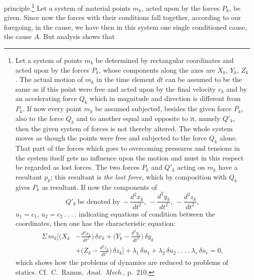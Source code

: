 \documentclass[12pt,a4paper]{book}
\begin{document}
principle.\footnote{Let a system of points $m_{k}$ be determined by rectangular coordinates
and acted upon by the forces $P_{k}$, whose components along the axes are $X_{k}$, $Y_{k}$,
$Z_{k}$. The actual motion of $m_{k}$ in the time element $dt$ can be assumed to be the same
as if this point were free and acted upon by the final velocity $v_{k}$ and by an accelerating
force $Q_{k}$ which in magnitude
and direction is different from $P_{k}$. If now every point $m_{k}$ be assumed subjected,
besides the given force $P_{k}$, also to the force $Q_{k}$ and to another equal and opposite
to it, namely $Q'_{k}$, then the given system of forces is not thereby altered. The whole
system moves as though the points were free and subjected to the force $Q_{k}$ alone. That
part of the forces which goes to overcoming pressures and tensions in the system itself gets
no influence upon the motion and must in this respect be regarded as lost forces. The two
forces $P_{k}$ and $Q'_{k}$ acting on $m_{k}$ have a resultant $p_{k}$; this resultant is
\emph{the lost force}, which by composition with $Q_{k}$ gives $P_{k}$ as resultant. If now
the components of
\[
Q'_{k}\ \text{be denoted by}\ -\frac{d^{2}x_{k}}{dt^{2}},\
-\frac{d^{2}y_{k}}{dt^{2}},\ -\frac{d^{2}z_{k}}{dt^{2}},
\]
$u_{1} = c_{1}$, $u_{2} = c_{2} \ .\ .\ .\ .$ indicating equations of condition between the
coordinates, then one has the characteristic equation:
\[
\begin{aligned}
\Sigma\, m_{k} \biggl[ \biggl( X_{k} &- \frac{d^{2}x_{k}}{dt^{2}}
   \biggr)\, \delta x_{k}
   + \biggl( Y_{k} - \frac{d^{2}y_{k}}{dt^{2}} \biggr)\, \delta y_{k}\\
   &+ \biggl( Z_{k} - \frac{d^{2}z_{k}}{dt^{2}} \biggr)\, \delta z_{k}
   \biggr] + \lambda_{1}\, \delta u_{1} + \lambda_{2}\, \delta u_{2}
   \ .\ .\ .\ .\ \lambda_{r}\, \delta u_{r} = 0,
\end{aligned}
\]
which shows how the problems of dynamics are reduced to problems of statics. Cf.\ C.\ Ramus,
\textit{Anal.\ Mech.}, p.\ 210.}
Let a system of material points $m_{k}$, acted upon by the forces $P_{k}$, be given. Since now
the forces with their conditions fall together, according to our foregoing, in the cause, we
have then in this system one single conditioned cause, the cause $A$. But analysis shows that
\end{document}

